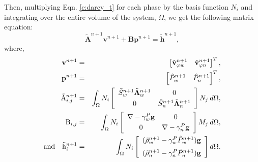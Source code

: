Then, multiplying Eqn. \ref{e:darcy_t} for each phase by the basis function $N_i$ and integrating over the entire volume of the system, $\Omega$, we get the following matrix equation:
\begin{equation}\label{e:darcy_matrix}
\tilde{\mathbf{A}}^{n+1} \mathbf{v}^{n+1} + \mathbf{B} \mathbf{p}^{n+1} = \tilde{\mathbf{h}}^{n+1},
\end{equation}
where,
\begin{eqnarray}
\mathbf{v}^{n+1} & = & \left[ \hat{\mathbf{v}}^{n+1}_{\phi w} \quad \hat{\mathbf{v}}^{n+1}_{\phi n} \right]^T,\\
\mathbf{p}^{n+1} & = & \left[ \hat{P}^{n+1}_w \quad \hat{P}^{n+1}_n \right]^T,\\
\tilde{\mathrm{A}}^{n+1}_{i,j} & = & \int_\Omega N_i \left[ \begin{array}{c c}
\tilde{S}^{n+1}_w \tilde{\mathbf{\Lambda}}^{n+1}_w & 0 \vspace*{1mm}\\
0 & \tilde{S}^{n+1}_n \tilde{\mathbf{\Lambda}}^{n+1}_n
\end{array} \right] N_j\: d\Omega,\\
\mathrm{B}_{i,j} & = & \int_\Omega N_i \left[ \begin{array}{c c}
\nabla - \gamma^P_w \mathbf{g} & 0 \vspace*{1mm}\\
0 & \nabla - \gamma^P_n \mathbf{g}
\end{array} \right] M_j\: d\Omega,\\
\mathrm{and} \quad \tilde{\mathrm{h}}^{n+1}_{i} & = & \int_\Omega N_i \left[ \begin{array}{c}
(\tilde{\rho}^{n+1}_w - \gamma_w^P \tilde{P}^{n+1}_w) \mathbf{g} \vspace*{2mm}\\
(\tilde{\rho}^{n+1}_n - \gamma_n^P \tilde{P}^{n+1}_n) \mathbf{g}
\end{array} \right] d\Omega.
\end{eqnarray}

